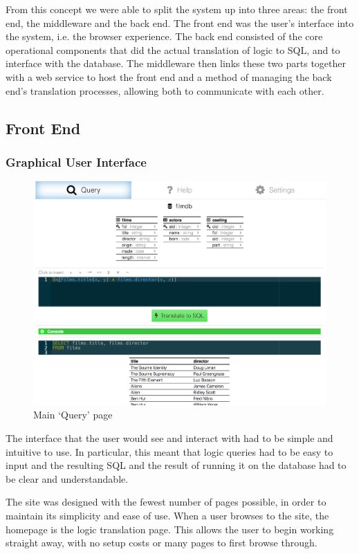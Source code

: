 \documentclass[a4paper, 11pt]{article}
\begin{document}
    From this concept we were able to split the system up into three areas: the
    front end, the middleware and the back end. The front end was the user's
    interface into the system, i.e. the browser experience. The back end
    consisted of the core operational components that did the actual translation
    of logic to SQL, and to interface with the database. The middleware then
    links these two parts together with a web service to host the front end and
    a method of managing the back end's translation processes, allowing both to
    communicate with each other.

  \subsection{Front End}
    \subsubsection{Graphical User Interface}
      \begin{figure}[h!]
        \includegraphics[width=\textwidth]{images/site_query.png}
        \caption{Main `Query' page}
      \end{figure}
      The interface that the user would see and interact with had to be simple
      and intuitive to use. In particular, this meant that logic queries had to
      be easy to input and the resulting SQL and the result of running it on
      the database had to be clear and understandable.

      The site was designed with the fewest number of pages possible, in order
      to maintain its simplicity and ease of use. When a user browses to the
      site, the homepage is the logic translation page. This allows the user to
      begin working straight away, with no setup costs or many pages to first
      browse through.
\end{document}
